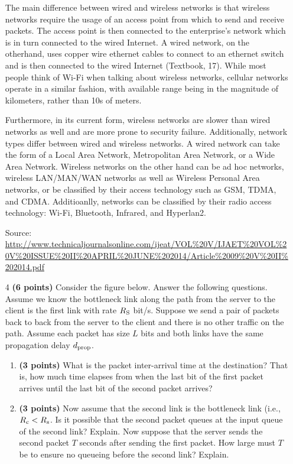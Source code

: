\documentclass{article}
\begin{document}
\begin{enumerate}
The main difference between wired and wireless networks is that wireless networks require the usage of an access point from which to send and receive packets. The access point is then connected to the enterprise's network which is in turn connected to the wired Internet. A wired network, on the otherhand, uses copper wire ethernet cables to connect to an ethernet switch and is then connected to the wired Internet (Textbook, 17). While most people think of Wi-Fi when talking about wireless networks, cellular networks operate in a similar fashion, with available range being in the magnitude of kilometers, rather than 10s of meters.

Furthermore, in its current form, wireless networks are slower than wired networks as well and are more prone to security failure. Additionally, network types differ between wired and wireless networks. A wired network can take the form of a Local Area Network, Metropolitan Area Network, or a Wide Area Network. Wireless networks on the other hand can be ad hoc networks, wireless LAN/MAN/WAN networks as well as Wireless Personal Area networks, or be classified by their access technology such as GSM, TDMA, and CDMA. Additioanlly, networks can be classified by their radio access technology: Wi-Fi, Bluetooth, Infrared, and Hyperlan2. 

Source: \url{http://www.technicaljournalsonline.com/ijeat/VOL\%20V/IJAET\%20VOL\%20V\%20ISSUE\%20II\%20APRIL\%20JUNE\%202014/Article\%2009\%20V\%20II\%202014.pdf}

\item[4]\textbf{(6 points)} Consider the figure below. Answer the following questions. Assume we know the bottleneck link along the path from the server to the client is the first link with rate $R\textsubscript{S}$ bit/s. Suppose we send a pair of packets back to back from the server to the client and there is no other traffic on the path. Assume each packet has size $L$ bits and both links have the same propagation delay $d\textsubscript{prop}$.

  \begin{enumerate}
      \item \textbf{(3 points)} What is the packet inter-arrival time at the destination? That is, how much time elapses from when the last bit of the first packet arrives until the last bit of the second packet arrives?
        \item \textbf{(3 points)} Now assume that the second link is the bottleneck link (i.e., $R\textsubscript{c} < R\textsubscript{s}$. Is it possible that the second packet queues at the input queue of the second link? Explain. Now suppose that the server sends the second packet $T$ seconds after sending the first packet. How large must $T$ be to ensure no queueing before the second link? Explain.  
    \end{enumerate}
    

\end{enumerate}
\end{document}
